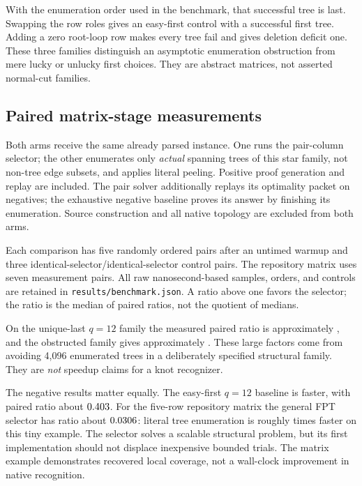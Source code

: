 \documentclass[11pt,letterpaper]{article}
\theoremstyle{definition}
\theoremstyle{remark}
\newcommand{\code}[1]{\nolinkurl{#1}}
\begin{document}
With the enumeration order used in the benchmark, that successful tree is last.
Swapping the row roles gives an easy-first control with a successful first tree.
Adding a zero root-loop row makes every tree fail and gives deletion deficit one.
These three families distinguish an asymptotic enumeration obstruction from
mere lucky or unlucky first choices. They are abstract matrices, not asserted
normal-cut families.

\subsection{Paired matrix-stage measurements}
Both arms receive the same already parsed instance. One runs the pair-column
selector; the other enumerates only \emph{actual} spanning trees of this star
family, not non-tree edge subsets, and applies literal peeling. Positive proof
generation and replay are included. The pair solver additionally replays its
optimality packet on negatives; the exhaustive negative baseline proves its
answer by finishing its enumeration. Source construction and all native topology
are excluded from both arms.

Each comparison has five randomly ordered pairs after an untimed warmup and
three identical-selector/identical-selector control pairs. The repository matrix
uses seven measurement pairs. All raw nanosecond-based samples, orders, and
controls are retained in \code{results/benchmark.json}. A ratio above one favors
the selector; the ratio is the median of paired ratios, not the quotient of
medians.



On the unique-last $q=12$ family the measured paired ratio is approximately
\UniqueLastRatio{}, and the obstructed family gives approximately \ObstructedRatio{}. These large factors
come from avoiding 4,096 enumerated trees in a deliberately specified structural
family. They are \emph{not} speedup claims for a knot recognizer.

The negative results matter equally. The easy-first $q=12$ baseline is faster,
with paired ratio about $0.403$. For the five-row repository matrix the general
FPT selector has ratio about $0.0306$: literal tree enumeration is roughly
\LoopSlowdown{} times faster on this tiny example. The selector solves a scalable structural
problem, but its first implementation should not displace inexpensive bounded
trials. The matrix example demonstrates recovered local coverage, not a
wall-clock improvement in native recognition.
\end{document}
